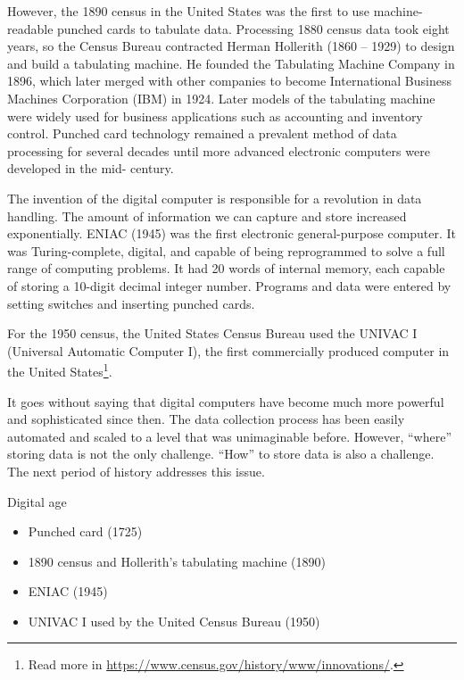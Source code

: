 However, the 1890 census in the United States was the first to use machine-readable
punched cards to tabulate data. Processing 1880 census data took eight years, so the
Census Bureau contracted Herman Hollerith (1860 -- 1929) to design and build a tabulating
machine.  He founded the Tabulating Machine Company in 1896, which later merged with other
companies to become International Business Machines Corporation (IBM) in 1924. Later
models of the tabulating machine were widely used for business applications such as
accounting and inventory control. Punched card technology remained a prevalent method of
data processing for several decades until more advanced electronic computers were
developed in the mid- century.

The invention of the digital computer is responsible for a revolution in data handling.
The amount of information we can capture and store increased exponentially.  ENIAC (1945) was
the first electronic general-purpose computer.  It was Turing-complete, digital, and
capable of being reprogrammed to solve a full range of computing problems.
It had 20 words of internal memory, each capable of storing a 10-digit decimal integer number.
Programs and data were entered by setting switches and inserting punched cards.

For the 1950 census, the United States Census Bureau used the
UNIVAC I (Universal Automatic Computer I), the first commercially produced computer in the
United States\footnote{Read more in \url{https://www.census.gov/history/www/innovations/}.}.

It goes without saying that digital computers have become much more powerful and
sophisticated since then.  The data collection process has been easily automated and
scaled to a level that was unimaginable before.  However, ``where'' storing data is
not the only challenge.  ``How'' to store data is also a challenge.  The next period of
history addresses this issue.

\begin{slidebox}{Digital age}{}
  \begin{itemize}
    \item Punched card (1725)
    \item 1890 census and Hollerith's tabulating machine (1890)
    \item ENIAC (1945)
    \item UNIVAC I used by the United Census Bureau (1950)
  \end{itemize}
\end{slidebox}

